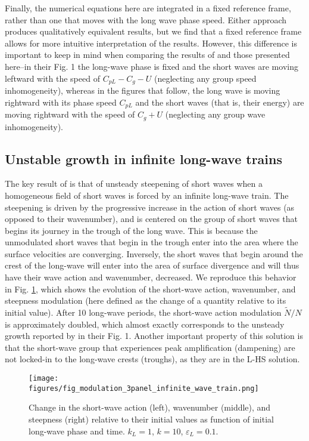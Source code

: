 \documentclass[draft]{agujournal2019}
\begin{document}
Finally, the numerical equations here are integrated in a fixed reference frame,
rather than one that moves with the long wave phase speed.
Either approach produces qualitatively equivalent results, but we find that
a fixed reference frame allows for more intuitive interpretation of the results.
However, this difference is important to keep in mind when comparing the results
of  and those presented here--in their Fig. 1 the
long-wave phase is fixed and the short waves are moving leftward
with the speed of $C_{pL} - C_g - U$ (neglecting any group speed inhomogeneity),
whereas in the figures that follow, the long wave is moving rightward with its
phase speed $C_{pL}$ and the short waves (that is, their energy) are moving
rightward with the speed of $C_g + U$ (neglecting any group wave inhomogeneity).

\subsection{Unstable growth in infinite long-wave trains}
\label{subsection:unstable_growth}

The key result of  is that of unsteady steepening of
short waves when a homogeneous field of short waves is forced by an infinite
long-wave train.
The steepening is driven by the progressive increase in the action of short
waves (as opposed to their wavenumber), and is centered on the group of short
waves that begins its journey in the trough of the long wave.
This is because the unmodulated short waves that begin in the trough enter into
the area where the surface velocities are converging.
Inversely, the short waves that begin around the crest of the long-wave will
enter into the area of surface divergence and will thus have their wave action
and wavenumber, decreased.
We reproduce this behavior in Fig. \ref{fig:modulation_3panel_infinite}, which
shows the evolution of the short-wave action, wavenumber, and steepness
modulation (here defined as the change of a quantity relative to its initial value).
After 10 long-wave periods, the short-wave action modulation $\widetilde{N}/N$
is approximately doubled, which almost exactly corresponds to the unsteady growth
reported by  in their Fig. 1.
Another important property of this solution is that the short-wave group that
experiences peak amplification (dampening) are not locked-in to the long-wave
crests (troughs), as they are in the L-HS solution.

\begin{figure}[h]
\label{fig:modulation_3panel_infinite}
\centering
\texttt{[image: figures/fig\_modulation\_3panel\_infinite\_wave\_train.png]}
\caption{
  Change in the short-wave action (left), wavenumber (middle), and steepness (right)
  relative to their initial values as function of initial long-wave phase and time.
  $k_L = 1$, $k = 10$, $\varepsilon_L = 0.1$.
}
\end{figure}
\end{document}
